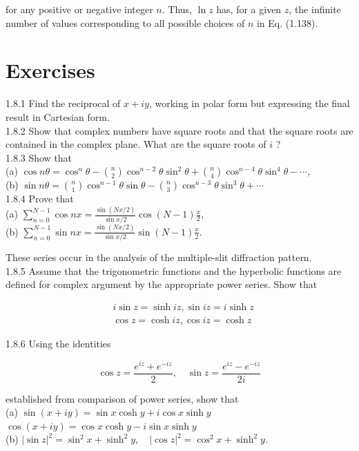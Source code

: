 \documentclass[10pt]{article}
\begin{document}
for any positive or negative integer $n$. Thus, $\ln z$ has, for a given $z$, the infinite number of values corresponding to all possible choices of $n$ in Eq. (1.138).

\section*{Exercises}
1.8.1 Find the reciprocal of $x+i y$, working in polar form but expressing the final result in Cartesian form.\\
1.8.2 Show that complex numbers have square roots and that the square roots are contained in the complex plane. What are the square roots of $i$ ?\\
1.8.3 Show that\\
(a) $\cos n \theta=\cos ^{n} \theta-\binom{n}{2} \cos ^{n-2} \theta \sin ^{2} \theta+\binom{n}{4} \cos ^{n-4} \theta \sin ^{4} \theta-\cdots$,\\
(b) $\sin n \theta=\binom{n}{1} \cos ^{n-1} \theta \sin \theta-\binom{n}{3} \cos ^{n-3} \theta \sin ^{3} \theta+\cdots$\\
1.8.4 Prove that\\
(a) $\sum_{n=0}^{N-1} \cos n x=\frac{\sin (N x / 2)}{\sin x / 2} \cos (N-1) \frac{x}{2}$,\\
(b) $\sum_{n=0}^{N-1} \sin n x=\frac{\sin (N x / 2)}{\sin x / 2} \sin (N-1) \frac{x}{2}$.

These series occur in the analysis of the multiple-slit diffraction pattern.\\
1.8.5 Assume that the trigonometric functions and the hyperbolic functions are defined for complex argument by the appropriate power series. Show that

$$
\begin{aligned}
& i \sin z=\sinh i z, \sin i z=i \sinh z \\
& \cos z=\cosh i z, \cos i z=\cosh z
\end{aligned}
$$

1.8.6 Using the identities

$$
\cos z=\frac{e^{i z}+e^{-i z}}{2}, \quad \sin z=\frac{e^{i z}-e^{-i z}}{2 i}
$$

established from comparison of power series, show that\\
(a) $\sin (x+i y)=\sin x \cosh y+i \cos x \sinh y$\\
$\cos (x+i y)=\cos x \cosh y-i \sin x \sinh y$\\
(b) $|\sin z|^{2}=\sin ^{2} x+\sinh ^{2} y, \quad|\cos z|^{2}=\cos ^{2} x+\sinh ^{2} y$.
\end{document}

